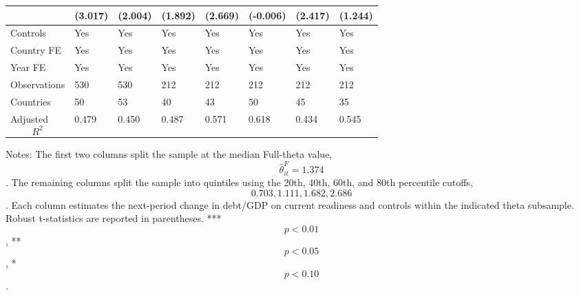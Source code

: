 \begin{table}[H]
\begin{threeparttable}
\begin{tabularx}{\textwidth}{lYYYYYYY}
  & (3.017) & (2.004) & (1.892) & (2.669) & (-0.006) & (2.417) & (1.244) \\
\midrule
Controls & Yes & Yes & Yes & Yes & Yes & Yes & Yes \\
Country FE & Yes & Yes & Yes & Yes & Yes & Yes & Yes \\
Year FE & Yes & Yes & Yes & Yes & Yes & Yes & Yes \\
Observations & 530 & 530 & 212 & 212 & 212 & 212 & 212 \\
Countries & 50 & 53 & 40 & 43 & 50 & 45 & 35 \\
Adjusted $$R^2$$ & 0.479 & 0.450 & 0.487 & 0.571 & 0.618 & 0.434 & 0.545 \\
\bottomrule
\end{tabularx}
\begin{tablenotes}[flushleft]\footnotesize
\item Notes: The first two columns split the sample at the median Full-theta value, $$\widehat{\theta}^{F}_{it}=1.374$$. The remaining columns split the sample into quintiles using the 20th, 40th, 60th, and 80th percentile cutoffs, $$0.703, 1.111, 1.682, 2.686$$. Each column estimates the next-period change in debt/GDP on current readiness and controls within the indicated theta subsample. Robust t-statistics are reported in parentheses. *** $$p<0.01$$, ** $$p<0.05$$, * $$p<0.10$$.
\end{tablenotes}
\end{threeparttable}
\end{table}
